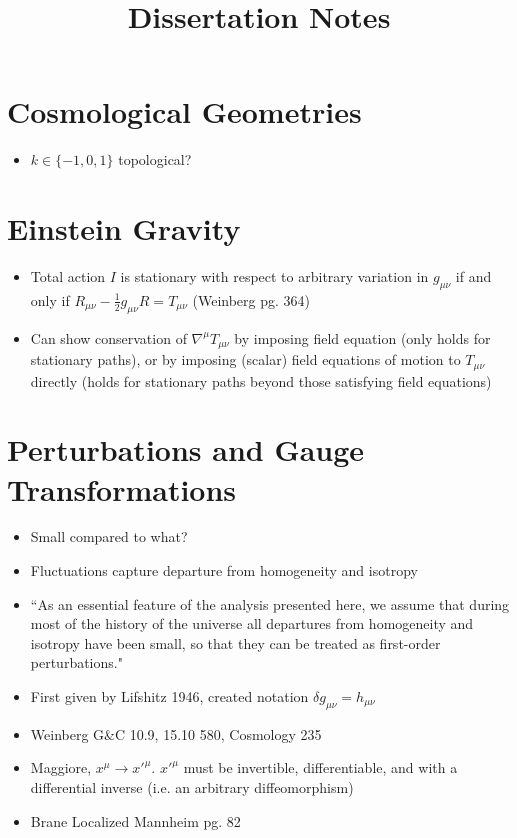 \documentclass[10pt,letterpaper]{article}
\title{Dissertation Notes}
\date{}
\numberwithin{equation}{section}
\begin{document}
 
\maketitle
\noindent 

\section*{Cosmological Geometries}
\begin{itemize}
	\item $k\in \{-1,0,1\}$ topological?
\end{itemize}
\section*{Einstein Gravity}
\begin{itemize}
	\item Total action $I$ is stationary with respect to arbitrary variation in $g_{\mu\nu}$ if and only if $R_{\mu\nu} - \frac{1}{2}g_{\mu\nu}R = T_{\mu\nu}$ (Weinberg pg. 364)
	\item Can show conservation of $\nabla^\mu T_{\mu\nu}$ by imposing field equation (only holds for stationary paths), or by imposing (scalar) field equations of motion to $T_{\mu\nu}$ directly (holds for stationary paths beyond those satisfying field equations)
\end{itemize}

\section*{Perturbations and Gauge Transformations}
\begin{itemize}
	\item Small compared to what?
	\item Fluctuations capture departure from homogeneity and isotropy
	\item ``As an essential feature of the analysis presented here, we assume that during most of the history of the universe all departures from homogeneity and isotropy have been small, so that they can be treated as first-order perturbations."
	\item First given by Lifshitz 1946, created notation $\delta g_{\mu\nu} = h_{\mu\nu}$
	\item Weinberg G\&C 10.9, 15.10 580, Cosmology 235
	\item Maggiore, $x^\mu \to x'^\mu$. $x'^\mu$ must be invertible, differentiable, and with a differential inverse (i.e. an arbitrary diffeomorphism)
	\item Brane Localized Mannheim pg. 82
\end{itemize}
\end{document}
